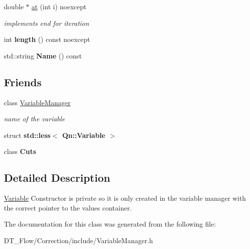 \begin{DoxyCompactItemize}
double $\ast$ \mbox{\hyperlink{classQn_1_1Variable_a3d5eafe37996f2b184cec7de2826195b}{at}} (int i) noexcept
\begin{DoxyCompactList}\small\item\em implements end for iteration \end{DoxyCompactList}\item 
\mbox{\label{classQn_1_1Variable_a9b43e5aff7c8284e254090ae0c3d0ec8}} 
int {\bfseries length} () const noexcept
\item 
\mbox{\label{classQn_1_1Variable_acb6923dc2e885c03aceca7ed4af0ae8e}} 
std\+::string {\bfseries Name} () const
\end{DoxyCompactItemize}
\subsection*{Friends}
\begin{DoxyCompactItemize}
\item 
\mbox{\label{classQn_1_1Variable_a06b58135e80b3f9cee3779c4012bb13b}} 
class \mbox{\hyperlink{classQn_1_1Variable_a06b58135e80b3f9cee3779c4012bb13b}{Variable\+Manager}}
\begin{DoxyCompactList}\small\item\em name of the variable \end{DoxyCompactList}\item 
\mbox{\label{classQn_1_1Variable_a3824609c0ee140743cfded6f82705420}} 
struct {\bfseries std\+::less$<$ Qn\+::\+Variable $>$}
\item 
\mbox{\label{classQn_1_1Variable_a0d5db8026106bb56e6f06abbf976d842}} 
class {\bfseries Cuts}
\end{DoxyCompactItemize}


\subsection{Detailed Description}
\mbox{\hyperlink{classQn_1_1Variable}{Variable}} Constructor is private so it is only created in the variable manager with the correct pointer to the values container. 

The documentation for this class was generated from the following file\+:\begin{DoxyCompactItemize}
\item 
D\+T\+\_\+\+Flow/\+Correction/include/Variable\+Manager.\+h\end{DoxyCompactItemize}
